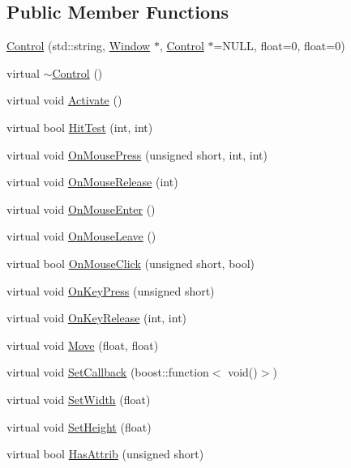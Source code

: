 \subsection*{Public Member Functions}
\begin{CompactItemize}
\item 
\hyperlink{class_control_47c96017a04b9fd78e73d7c0cbd397d4}{Control} (std::string, \hyperlink{class_window}{Window} $\ast$, \hyperlink{class_control}{Control} $\ast$=NULL, float=0, float=0)
\item 
virtual \hyperlink{class_control_edda1328c4f8b8d49bca8f0812d3bfd1}{$\sim$Control} ()
\item 
virtual void \hyperlink{class_control_85211d42235ce9dd321aa9d027d71bdd}{Activate} ()
\item 
virtual bool \hyperlink{class_control_6b586494213774ccc17b161f8ed14888}{HitTest} (int, int)
\item 
virtual void \hyperlink{class_control_17ebdd745fcaf245f8d8ab38fa534072}{OnMousePress} (unsigned short, int, int)
\item 
virtual void \hyperlink{class_control_7d95c48b4e3498938e52991e60a89181}{OnMouseRelease} (int)
\item 
virtual void \hyperlink{class_control_93451fdae5cd22b9c52374db759c291c}{OnMouseEnter} ()
\item 
virtual void \hyperlink{class_control_6f2e2b8b0984a37b64b9113a1fdf683d}{OnMouseLeave} ()
\item 
virtual bool \hyperlink{class_control_1a32f38d1f66f764e6e3a5d8de42d0e0}{OnMouseClick} (unsigned short, bool)
\item 
virtual void \hyperlink{class_control_381e61b70477155845f58a2d17b91c6a}{OnKeyPress} (unsigned short)
\item 
virtual void \hyperlink{class_control_7be3bcc25d2736d0732e29de40c41b9f}{OnKeyRelease} (int, int)
\item 
virtual void \hyperlink{class_control_8ba2e26364554895c0581a6d3e569649}{Move} (float, float)
\item 
virtual void \hyperlink{class_control_c4ea1db7ec1776ad19d7f81d5a01743e}{SetCallback} (boost::function$<$ void()$>$)
\item 
virtual void \hyperlink{class_control_eef729e67952600e2ed998147d330eb6}{SetWidth} (float)
\item 
virtual void \hyperlink{class_control_e2199949a3bbb73abf5d59d48aa7aad5}{SetHeight} (float)
\item 
virtual bool \hyperlink{class_control_969c60da0ff3cfd832a26a1310e0930d}{HasAttrib} (unsigned short)

\end{CompactItemize}
